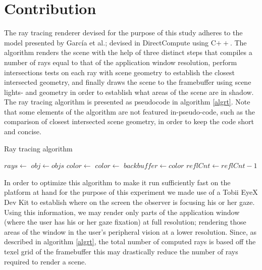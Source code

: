 
\section{Contribution}
The ray tracing renderer devised for the purpose of this study adheres to the model presented by Garc{\'i}a et al.; devised in DirectCompute using C$++$.
The algorithm renders the scene with the help of three distinct steps that compiles a number of rays equal to that of the application window resolution, perform intersections tests on each ray with scene geometry to establish the closest intersected geometry, and finally draws the scene to the framebuffer using scene lights- and geometry in order to establish what areas of the scene are in shadow.
The ray tracing algorithm is presented as pseudocode in algorithm \ref{algrt}.
Note that some elements of the algorithm are not featured in-pseudo-code, such as the comparison of closest intersected scene geometry, in order to keep the code short and concise.

\begin{algorithm}
\begin{algorithmic}[1]
\caption{Ray tracing algorithm}\label{algrt}
\State $rays\gets$
    \State $obj\gets objs$
\EndIf
\State $color\gets$
\State $color\gets$
\EndFor
\State $backbuffer\gets color$
\EndFor
\State $reflCnt\gets reflCnt - 1$
\EndWhile
\EndProcedure
\end{algorithmic}
\end{algorithm}

In order to optimize this algorithm to make it run sufficiently fast on the platform at hand for the purpose of this experiment we made use of a Tobii EyeX Dev Kit to establish where on the screen the observer is focusing his or her gaze.
Using this information, we may render only parts of the application window (where the user has his or her gaze fixation) at full resolution; rendering those areas of the window in the user's peripheral vision at a lower resolution.
Since, as described in algorithm \ref{algrt}, the total number of computed rays is based off the texel grid of the framebuffer this may drastically reduce the number of rays required to render a scene.

